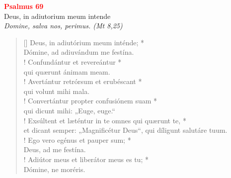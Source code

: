 


\def\greinitialformat#1{%
{\fontsize{39}{39}\selectfont #1}%
}




\vspace{0.3cm}
\begin{center}
 \textcolor{red}{\large \bf Psalmus 69}\\
Deus, in adiutorium meum intende\\
\textit{\small Domine, salva nos, perimus. (Mt 8,25)}
\end{center}
\begin{verse}[\versewidth]
Deus, in adiutórium meum inténde; *\\
Dómine, ad adiuvándum me festína.\\!
\vin Confundántur et revereántur *\\
\vin qui quærunt ánimam meam.\\!
Avertántur retrórsum et erubéscant *\\
qui volunt mihi mala.\\!
\vin Convertántur propter confusiónem suam *\\
\vin qui dicunt mihi: „Euge, euge.“\\!
Exsúltent et læténtur in te omnes qui quærunt te, *\\
et dicant semper: „Magnificétur Deus“, qui díligunt salutáre tuum.\\!
\vin Ego vero egénus et pauper sum; *\\
\vin Deus, ad me festína.\\!
Adiútor meus et liberátor meus es tu; *\\
Dómine, ne moréris.\\
\end{verse}
\vspace{1cm}



